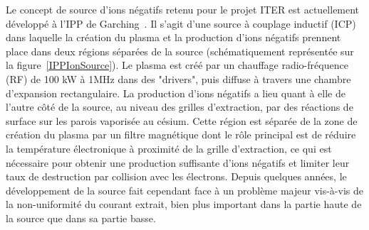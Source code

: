 \begin{refsection}
Le concept de source d'ions négatifs retenu pour le projet ITER est
actuellement développé à l'IPP de Garching~\parencite{Hemsworth}. Il s'agit
d'une source à couplage inductif (ICP) dans laquelle la création du plasma et la
production d'ions négatifs prennent place dans deux régions séparées de la
source (schématiquement représentée sur la
figure~\ref{IPPIonSource}). Le plasma est créé par un chauffage radio-fréquence
(RF) de 100 kW à 1MHz dans des "drivers", puis diffuse à travers une chambre
d'expansion rectangulaire. La production d'ions négatifs a lieu quant à elle de
l'autre côté de la source, au niveau des grilles d'extraction, par des
réactions de surface sur les parois vaporisée au césium.
Cette région est séparée de la zone de création du plasma par un filtre magnétique dont le rôle
principal est de réduire la température électronique à proximité de la grille
d'extraction, ce qui est nécessaire pour obtenir une production suffisante
d'ions négatifs et limiter leur taux de destruction par collision avec les
électrons. 
Depuis quelques années, le développement de la source fait cependant face à un
problème majeur vis-à-vis de la non-uniformité du courant extrait, bien plus
important dans la partie haute de la source que dans sa partie basse. 


\end{refsection}
